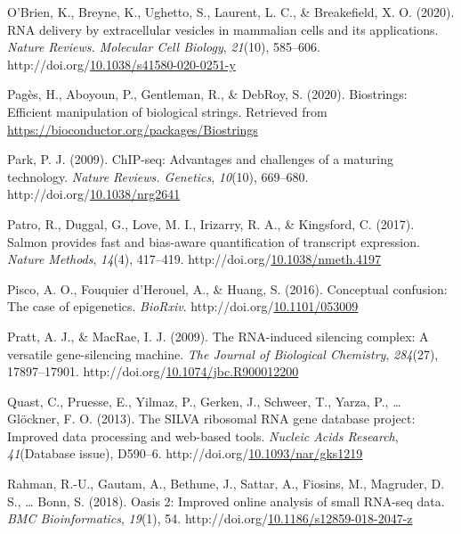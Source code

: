 \documentclass[12pt,twoside]{reedthesis}
\newlength{\cslhangindent}
\newenvironment{CSLReferences}[2] %
 {%
  \setlength{\parindent}{0pt}
  \ifodd #1 \everypar{\setlength{\hangindent}{\cslhangindent}}\ignorespaces\fi
  \ifnum #2 > 0
  \setlength{\parskip}{#2\baselineskip}
  \fi
 }%
 {}
\begin{document}
\begin{CSLReferences}{1}{0}
\leavevmode{}%
O'Brien, K., Breyne, K., Ughetto, S., Laurent, L. C., \& Breakefield, X. O. (2020). RNA delivery by extracellular vesicles in mammalian cells and its applications. \emph{Nature Reviews. Molecular Cell Biology}, \emph{21}(10), 585--606. http://doi.org/\href{https://doi.org/10.1038/s41580-020-0251-y}{10.1038/s41580-020-0251-y}

\leavevmode{}%
Pagès, H., Aboyoun, P., Gentleman, R., \& DebRoy, S. (2020). Biostrings: Efficient manipulation of biological strings. Retrieved from \url{https://bioconductor.org/packages/Biostrings}

\leavevmode{}%
Park, P. J. (2009). ChIP-seq: Advantages and challenges of a maturing technology. \emph{Nature Reviews. Genetics}, \emph{10}(10), 669--680. http://doi.org/\href{https://doi.org/10.1038/nrg2641}{10.1038/nrg2641}

\leavevmode{}%
Patro, R., Duggal, G., Love, M. I., Irizarry, R. A., \& Kingsford, C. (2017). Salmon provides fast and bias-aware quantification of transcript expression. \emph{Nature Methods}, \emph{14}(4), 417--419. http://doi.org/\href{https://doi.org/10.1038/nmeth.4197}{10.1038/nmeth.4197}

\leavevmode{}%
Pisco, A. O., Fouquier d'Herouel, A., \& Huang, S. (2016). Conceptual confusion: The case of epigenetics. \emph{BioRxiv}. http://doi.org/\href{https://doi.org/10.1101/053009}{10.1101/053009}

\leavevmode{}%
Pratt, A. J., \& MacRae, I. J. (2009). The RNA-induced silencing complex: A versatile gene-silencing machine. \emph{The Journal of Biological Chemistry}, \emph{284}(27), 17897--17901. http://doi.org/\href{https://doi.org/10.1074/jbc.R900012200}{10.1074/jbc.R900012200}

\leavevmode{}%
Quast, C., Pruesse, E., Yilmaz, P., Gerken, J., Schweer, T., Yarza, P., \ldots{} Glöckner, F. O. (2013). The SILVA ribosomal RNA gene database project: Improved data processing and web-based tools. \emph{Nucleic Acids Research}, \emph{41}(Database issue), D590--6. http://doi.org/\href{https://doi.org/10.1093/nar/gks1219}{10.1093/nar/gks1219}

\leavevmode{}%
Rahman, R.-U., Gautam, A., Bethune, J., Sattar, A., Fiosins, M., Magruder, D. S., \ldots{} Bonn, S. (2018). Oasis 2: Improved online analysis of small RNA-seq data. \emph{BMC Bioinformatics}, \emph{19}(1), 54. http://doi.org/\href{https://doi.org/10.1186/s12859-018-2047-z}{10.1186/s12859-018-2047-z}


\end{CSLReferences}
\end{document}
